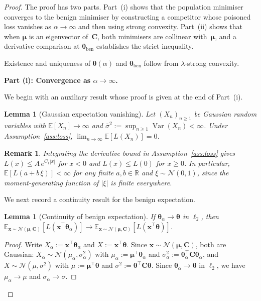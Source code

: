 \documentclass[11pt]{article}
\newcommand{\RR}{\mathbb{R}}
\newcommand{\EE}{\mathbb{E}}
\newcommand{\NN}{\mathcal{N}}
\newcommand{\C}{\mathbf{C}}
\newcommand{\x}{\mathbf{x}}
\newcommand{\bmu}{\boldsymbol{\mu}}
\newcommand{\btheta}{\boldsymbol{\theta}}
\newtheorem{lemma}[theorem]{Lemma}
\newtheorem{remark}{Remark}
\begin{document}
\begin{proof}
The proof has two parts.
Part~(i) shows that the population minimiser converges to the benign
minimiser by constructing a competitor whose poisoned loss vanishes
as $\alpha \to \infty$ and then using strong convexity.
Part~(ii) shows that when $\bmu$ is an eigenvector of~$\C$, both
minimisers are collinear with~$\bmu$, and a derivative comparison
at $\btheta_{\mathrm{ben}}$ establishes the strict inequality.

Existence and uniqueness of $\btheta(\alpha)$ and
$\btheta_{\mathrm{ben}}$ follow from $\lambda$-strong convexity.

\medskip
\noindent\textbf{Part (i): Convergence as $\alpha \to \infty$.}

We begin with an auxiliary result whose proof is given at the end
of Part~(i).

\begin{lemma}[Gaussian expectation vanishing]
\label{lem:gauss_vanish}
Let $(X_n)_{n \geq 1}$ be Gaussian random variables with
$\EE[X_n] \to \infty$ and
$\bar\sigma^2 := \sup_{n \geq 1}\operatorname{Var}(X_n) < \infty$.
Under Assumption~\ref{ass:loss},
$\lim_{n \to \infty}\EE[L(X_n)] = 0$.
\end{lemma}

\begin{remark}\label{rem:gauss_int}
Integrating the derivative bound in Assumption~\ref{ass:loss} gives
$L(x) \leq A\,e^{C_1|x|}$ for $x < 0$ and $L(x) \leq L(0)$
for $x \geq 0$.
In particular, $\EE[L(a + b\,\xi)] < \infty$ for any finite
$a,b\in\RR$ and $\xi \sim \NN(0,1)$, since the moment-generating
function of $|\xi|$ is finite everywhere. 
\end{remark}

We next record a continuity result for the benign expectation.

\begin{lemma}[Continuity of benign expectation]
\label{lem:benign_cont}
If $\btheta_\alpha \to \btheta$ in $\ell_2$, then
$\EE_{\x\sim\NN(\bmu,\C)}[L(\x^\top\btheta_\alpha)]
\to \EE_{\x\sim\NN(\bmu,\C)}[L(\x^\top\btheta)]$.
\end{lemma}
\begin{proof}
Write $X_\alpha := \x^\top\btheta_\alpha$ and
$X := \x^\top\btheta$.
Since $\x\sim\NN(\bmu,\C)$, both are Gaussian:
$X_\alpha\sim\NN(\mu_\alpha,\sigma_\alpha^2)$ with
$\mu_\alpha := \bmu^\top\btheta_\alpha$ and
$\sigma_\alpha^2 := \btheta_\alpha^\top\C\btheta_\alpha$,
and $X\sim\NN(\mu,\sigma^2)$ with
$\mu := \bmu^\top\btheta$ and
$\sigma^2 := \btheta^\top\C\btheta$.
Since $\btheta_\alpha\to\btheta$ in $\ell_2$,
we have $\mu_\alpha\to\mu$ and $\sigma_\alpha\to\sigma$.


\end{proof}
\end{proof}
\end{document}
